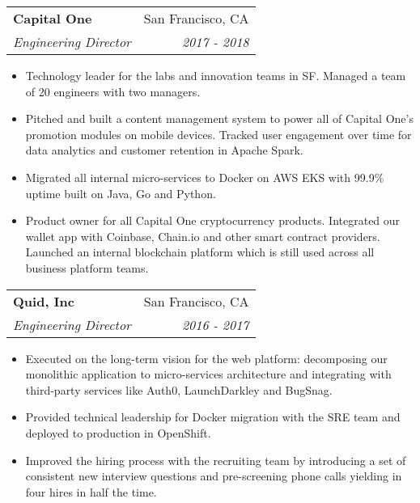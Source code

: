 \documentclass[letterpaper,11pt]{article}
\makeatletter
\newcommand{\resumeSubheading}[4]{
  \vspace{-1pt}\item
    \begin{tabular*}{0.97\textwidth}[t]{l@{\extracolsep{\fill}}r}
      \textbf{#1} & #2 \\
      \textit{\small#3} & \textit{\small #4} \\
    \end{tabular*}\vspace{-5pt}
}
\newcommand{\resumeItemListStart}{\begin{itemize}}
\newcommand{\resumeItemListEnd}{\end{itemize}\vspace{-5pt}}
\makeatother
\begin{document}
    \pagebreak[3]

    \resumeSubheading
    {Capital One}{San Francisco, CA}
    {Engineering Director}{2017 - 2018}
    \resumeItemListStart
      \item Technology leader for the labs and innovation teams in SF. Managed a team of 20 engineers with two managers.
      \item Pitched and built a content management system to power all of Capital One’s promotion modules on mobile devices. Tracked user engagement over time for data analytics and customer retention in Apache Spark.
      \item Migrated all internal micro-services to Docker on AWS EKS with 99.9\% uptime built on Java, Go and Python.
      \item Product owner for all Capital One cryptocurrency products. Integrated our wallet app with Coinbase, Chain.io and other smart contract providers. Launched an internal blockchain platform which is still used across all business platform teams.
    \resumeItemListEnd

    \pagebreak[3]

    \resumeSubheading
    {Quid, Inc}{San Francisco, CA}
    {Engineering Director}{2016 - 2017}
    \resumeItemListStart
      \item Executed on the long-term vision for the web platform: decomposing our monolithic application to micro-services architecture and integrating with third-party services like Auth0, LaunchDarkley and BugSnag.
      \item Provided technical leadership for Docker migration with the SRE team and deployed to production in OpenShift.
      \item Improved the hiring process with the recruiting team by introducing a set of consistent new interview questions and pre-screening phone calls yielding in four hires in half the time.
    \resumeItemListEnd

    \pagebreak[3]
\end{document}
